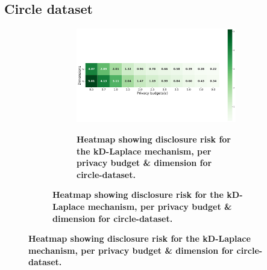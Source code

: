\newpage
\subsection{Circle dataset} \label{appendix:results-privacy-circle-dataset}
\begin{figure}
    \centering
    \begin{subfigure}[b]{0.85\textwidth}
        \begin{subfigure}[c]{1\textwidth}
            \caption{\textbf{Heatmap showing disclosure risk for the kD-Laplace mechanism, per privacy budget \& dimension for circle-dataset.}}
            \includegraphics[width=1\textwidth]{Results/kd-laplace/kd-Laplace/circle-dataset/distance.png}
            \label{fig:privacy-risk_circle-dataset_adversial_advantage_kd-laplace}
        \end{subfigure}
        \vfill %


\end{subfigure}
\end{figure}
